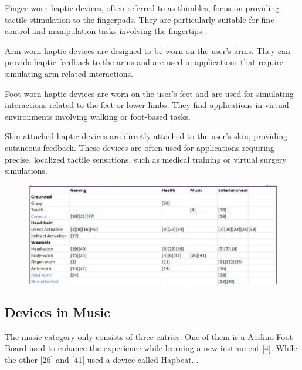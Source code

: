 Finger-worn haptic devices, often referred to as thimbles, focus on providing tactile stimulation to the fingerpads. They are particularly suitable for fine control and manipulation tasks involving the fingertips. 

Arm-worn haptic devices are designed to be worn on the user's arms. They can provide haptic feedback to the arms and are used in applications that require simulating arm-related interactions. 

Foot-worn haptic devices are worn on the user's feet and are used for simulating interactions related to the feet or lower limbs. They find applications in virtual environments involving walking or foot-based tasks. 

Skin-attached haptic devices are directly attached to the user's skin, providing cutaneous feedback. These devices are often used for applications requiring precise, localized tactile sensations, such as medical training or virtual surgery simulations.


\begin{figure}[htbp]
	\includegraphics[width=\columnwidth]{figures/broad.pdf}
	\label{fig:broad}
\end{figure}


\subsection{Devices in Music}
The music category only consists of three entries. One of them is a Audino Foot Board used to enhance the experience while learning a new instrument [4]. While the other [26] and [41] used a device called Hapbeat...


